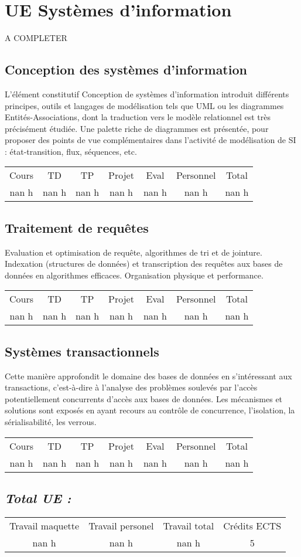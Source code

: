 \section{UE Systèmes d'information}%
\label{sec:UESystmesdinformation}%
A COMPLETER%
\subsection{Conception des systèmes d'information}%
\label{subsec:Conceptiondessystmesdinformation}%

%
L’élément constitutif Conception de systèmes d’information introduit différents principes, outils et langages de modélisation tels que UML ou les diagrammes Entités{-}Associations, dont la traduction vers le modèle relationnel est très précisément étudiée. Une palette riche de diagrammes est présentée, pour proposer des points de vue complémentaires dans l’activité de modélisation de SI : état{-}transition, flux, séquences, etc.%
\begin{longtable}{c c c c c c c}%
\hline%
Cours&TD&TP&Projet&Eval&Personnel&Total\\%
nan h&nan h&nan h&nan h&nan h&nan h&nan h\\%
\hline%
\end{longtable}%
\subsection{Traitement de requêtes}%
\label{subsec:Traitementderequtes}%

%
Evaluation et optimisation de requête, algorithmes de tri et de jointure. Indexation (structures de données) et transcription des requêtes aux bases de données en algorithmes efficaces. Organisation physique et performance.%
\begin{longtable}{c c c c c c c}%
\hline%
Cours&TD&TP&Projet&Eval&Personnel&Total\\%
nan h&nan h&nan h&nan h&nan h&nan h&nan h\\%
\hline%
\end{longtable}%
\subsection{Systèmes transactionnels}%
\label{subsec:Systmestransactionnels}%

%
Cette manière approfondit le domaine des bases de données en s'intéressant aux transactions, c’est{-}à{-}dire à l'analyse des problèmes soulevés par l'accès potentiellement concurrents d'accès aux bases de données. Les mécanismes et solutions sont exposés en ayant recours au contrôle de concurrence, l'isolation, la sérialisabilité, les verrous.%
\begin{longtable}{c c c c c c c}%
\hline%
Cours&TD&TP&Projet&Eval&Personnel&Total\\%
nan h&nan h&nan h&nan h&nan h&nan h&nan h\\%
\hline%
\end{longtable}%
\subsection{\textit{Total UE :}}%
\label{subsec:textitTotalUE}%

%
\begin{longtable}{c c c c}%
\hline%
Travail maquette&Travail personel&Travail total&Crédits ECTS\\%
nan h&nan h&nan h&5\\%
\hline%
\end{longtable}